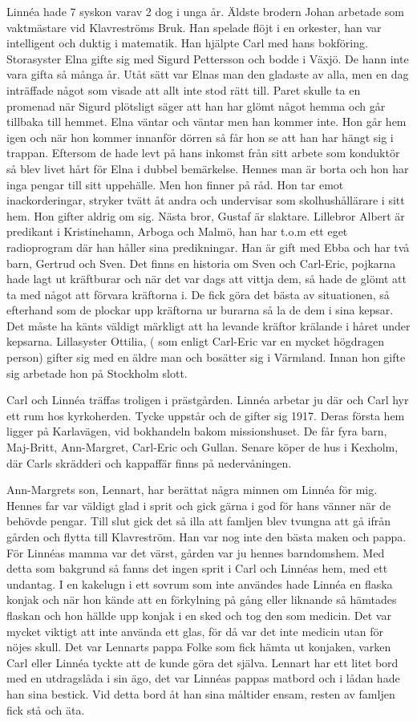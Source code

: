 Linnéa hade 7 syskon varav 2 dog i unga år. Äldste brodern Johan arbetade som vaktmästare vid Klavreströms Bruk. Han spelade flöjt i en orkester, han var intelligent och duktig i matematik. Han hjälpte Carl med hans bokföring. Storasyster Elna gifte sig med Sigurd Pettersson och bodde i Växjö. De hann inte vara gifta så många år. Utåt sätt var Elnas man den gladaste av alla, men en dag inträffade något som visade att allt inte stod rätt till. Paret skulle ta en promenad när Sigurd plötsligt säger att han har glömt något hemma och går tillbaka till hemmet. Elna väntar och väntar men han kommer inte. Hon går hem igen och när hon kommer innanför dörren så får hon se att han har hängt sig i trappan. Eftersom de hade levt på hans inkomst från sitt arbete som konduktör så blev livet hårt för Elna i dubbel bemärkelse. Hennes man är borta och hon har inga pengar till sitt uppehälle.
Men hon finner på råd. Hon tar emot inackorderingar, stryker tvätt åt andra och undervisar som skolhushållärare i sitt hem. Hon gifter aldrig om sig.
Nästa bror, Gustaf är slaktare. Lillebror Albert är predikant i Kristinehamn, Arboga och Malmö, han har t.o.m ett eget radioprogram där han håller sina predikningar. Han är gift med Ebba och har två barn, Gertrud och Sven. Det finns en historia om Sven och Carl-Eric, pojkarna hade lagt ut kräftburar och när det var dags att vittja dem, så hade de glömt att ta med något att förvara kräftorna i. De fick göra det bästa av situationen, så efterhand som de plockar upp kräftorna ur burarna så la de dem i sina kepsar. Det måste ha känts väldigt märkligt att ha levande kräftor krälande i håret  under kepsarna. Lillasyster Ottilia, ( som enligt Carl-Eric var en mycket högdragen person) gifter sig med en äldre man och bosätter sig i Värmland. Innan hon gifte sig arbetade hon på Stockholm slott.

Carl och Linnéa träffas troligen i prästgården. Linnéa arbetar ju där och Carl hyr ett rum hos kyrkoherden. Tycke uppstår och de gifter sig 1917. Deras första hem ligger på Karlavägen, vid bokhandeln bakom missionshuset. De får fyra barn, Maj-Britt, Ann-Margret, Carl-Eric och Gullan.
Senare köper de hus i Kexholm, där Carls skrädderi och kappaffär finns på nedervåningen.

Ann-Margrets son, Lennart, har berättat några minnen om Linnéa för mig. Hennes far var väldigt glad i sprit och gick gärna i god för hans vänner när de behövde pengar. Till slut gick det så illa att famljen blev tvungna att gå ifrån gården och flytta till Klavreström. Han var nog inte den bästa maken och pappa. För Linnéas mamma var det värst, gården var ju hennes barndomshem.
Med detta som bakgrund så fanns det ingen sprit i Carl och Linnéas hem, med ett undantag. I en kakelugn i ett sovrum som inte användes hade Linnéa en flaska konjak och när hon kände att en förkylning på gång eller liknande så hämtades flaskan och hon hällde upp konjak i en sked och tog den som medicin. Det var mycket viktigt att inte använda ett glas, för då var det inte medicin utan för nöjes skull. Det var Lennarts pappa Folke som fick hämta ut konjaken, varken Carl eller Linnéa tyckte att de kunde göra det själva.
Lennart har ett litet bord med en utdragslåda i sin ägo, det var Linnéas pappas matbord och i lådan hade han sina bestick. Vid detta bord åt han sina måltider ensam, resten av famljen fick stå och äta.
